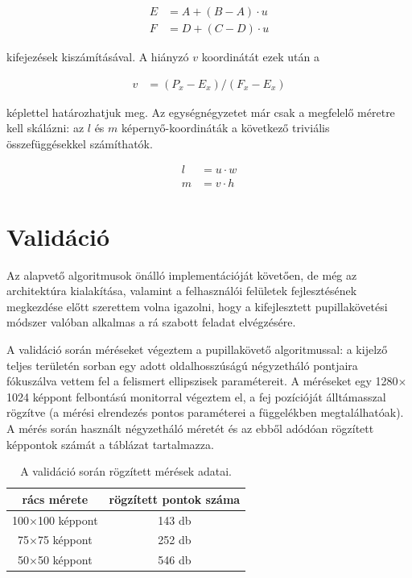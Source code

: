 \begin{align}\label{eq:calib_3}
E &= A + (B-A) \cdot u \nonumber \\
F &= D + (C-D) \cdot u
\end{align}

kifejezések kiszámításával. A hiányzó $v$ koordinátát ezek után a 

\begin{align}\label{eq:calib_4}
v &= (P_x - E_x) / (F_x - E_x)
\end{align}

képlettel határozhatjuk meg. Az egységnégyzetet már csak a megfelelő méretre kell skálázni: az $l$ és $m$ képernyő-koordináták a következő triviális összefüggésekkel számíthatók.

\begin{align}\label{eq:calib_5}
l &= u \cdot w \nonumber \\
m &= v \cdot h
\end{align}

\section{Validáció}\label{sect:validacio}

Az alapvető algoritmusok önálló implementációját követően, de még az architektúra kialakítása, valamint a felhasználói felületek fejlesztésének megkezdése előtt szerettem volna igazolni, hogy a kifejlesztett pupillakövetési módszer valóban alkalmas a rá szabott feladat elvégzésére.

A validáció során méréseket végeztem a pupillakövető algoritmussal: a kijelző teljes területén sorban egy adott oldalhosszúságú négyzetháló pontjaira fókuszálva vettem fel a felismert ellipszisek paramétereit. A méréseket egy 1280$\times$1024 képpont felbontású monitorral végeztem el, a fej pozícióját álltámasszal rögzítve (a mérési elrendezés pontos paraméterei a  függelékben megtalálhatóak). A mérés során használt négyzetháló méretét és az ebből adódóan rögzített képpontok számát a  táblázat tartalmazza.

\begin{table}[ht]
	\centering
	\caption{A validáció során rögzített mérések adatai.} \label{tab:meresi_pontok}
	\begin{tabular}{ c | c }
	rács mérete & rögzített pontok száma \\ \hline \hline
	100$\times$100 képpont & 143 db \\
	75$\times$75 képpont & 252 db \\
	50$\times$50 képpont & 546 db \\
	\end{tabular}
\end{table}


